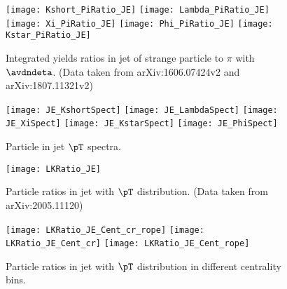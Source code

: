 \documentclass[ALICE,manyauthors]{StrinJet}
\begin{document}
\begin{figure}[ht]
	\begin{center}
		\texttt{[image: Kshort\_PiRatio\_JE]}
		\texttt{[image: Lambda\_PiRatio\_JE]}
		\texttt{[image: Xi\_PiRatio\_JE]}
		\texttt{[image: Phi\_PiRatio\_JE]}
		\texttt{[image: Kstar\_PiRatio\_JE]}
	\end{center}
	\caption{Integrated yields ratios in jet of strange particle to $\pi$ with $\avdndeta$. (Data taken from arXiv:1606.07424v2 and arXiv:1807.11321v2)}
	\label{fig:JEIntePartoPiRatio}
\end{figure}


\begin{figure}[ht]
	\begin{center}
		\texttt{[image: JE\_KshortSpect]}
		\texttt{[image: JE\_LambdaSpect]}
		\texttt{[image: JE\_XiSpect]}
		\texttt{[image: JE\_KstarSpect]}
		\texttt{[image: JE\_PhiSpect]}
	\end{center}
	\caption{Particle in jet $\pT$ spectra.}
	\label{fig:JEParSpect}
\end{figure}


\begin{figure}[ht]
	\begin{center}
		\texttt{[image: LKRatio\_JE]}
	\end{center}
	\caption{Particle ratios in jet with $\pT$ distribution. (Data taken from arXiv:2005.11120)}
	\label{fig:JEParRatio}
\end{figure}


\begin{figure}[ht]
	\begin{center}
		\texttt{[image: LKRatio\_JE\_Cent\_cr\_rope]}
		\texttt{[image: LKRatio\_JE\_Cent\_cr]}
		\texttt{[image: LKRatio\_JE\_Cent\_rope]}

	\end{center}
	\caption{Particle ratios in jet with $\pT$ distribution in different centrality bins.}
	\label{fig:JEParRatioCent}
\end{figure}
\end{document}
